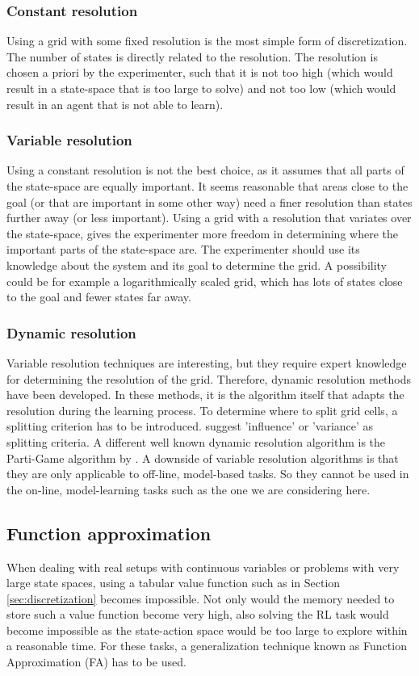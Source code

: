 \documentclass[a4paper,11pt]{mscLiterature}
\begin{document}
	\subsubsection{Constant resolution}
	Using a grid with some fixed resolution is the most simple form of discretization. The number of states is directly related to the resolution. The resolution is chosen a priori by the experimenter, such that it is not too high (which would result in a state-space that is too large to solve) and not too low (which would result in an agent that is not able to learn). 
	\subsubsection{Variable resolution}
	Using a constant resolution is not the best choice, as it assumes that all parts of the state-space are equally important. It seems reasonable that areas close to the goal (or that are important in some other way) need a finer resolution than states further away (or less important). Using a grid with a resolution that variates over the state-space, gives the experimenter more freedom in determining where the important parts of the state-space are. The experimenter should use its knowledge about the system and its goal to determine the grid. A possibility could be for example a logarithmically scaled grid, which has lots of states close to the goal and fewer states far away.
	\subsubsection{Dynamic resolution}
	Variable resolution techniques are interesting, but they require expert knowledge for determining the resolution of the grid. Therefore, dynamic resolution methods have been developed. In these methods, it is the algorithm itself that adapts the resolution during the learning process. To determine where to split grid cells, a splitting criterion has to be introduced. \cite{MunosMoore:01} suggest 'influence' or 'variance' as splitting criteria. A different well known dynamic resolution algorithm is the Parti-Game algorithm by \cite{MooreAtkeson:95}. A downside of variable resolution algorithms is that they are only applicable to off-line, model-based tasks. So they cannot be used in the on-line, model-learning tasks such as the one we are considering here.
	


	\subsection{Function approximation} \label{sec:functionApproximation}
	When dealing with real setups with continuous variables or problems with very large state spaces, using a tabular value function such as in Section \ref{sec:discretization} becomes impossible. Not only would the memory needed to store such a value function become very high, also solving the RL task would become impossible as the state-action space would be too large to explore within a reasonable time. For these tasks, a generalization technique known as Function Approximation (FA) has to be used. 
	
\end{document}
